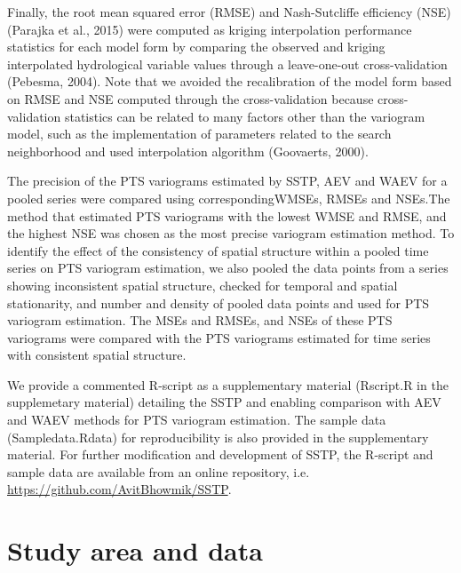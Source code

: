 Finally, the root mean squared error (RMSE) and Nash-Sutcliffe efficiency (NSE) (Parajka et al., 2015) were computed as kriging interpolation performance statistics for each model form by comparing the observed and kriging interpolated hydrological variable values through a leave-one-out cross-validation (Pebesma, 2004). Note that we avoided the recalibration of the model form based on RMSE and NSE computed through the cross-validation because cross-validation statistics can be related to many factors other than the variogram model, such as the implementation of parameters related to the search neighborhood and used interpolation algorithm (Goovaerts, 2000).

The precision of the PTS variograms estimated by SSTP, AEV and WAEV for a pooled series were compared using correspondingWMSEs, RMSEs and NSEs.The method that estimated PTS variograms with the lowest WMSE and RMSE, and the highest NSE was chosen as the most precise variogram estimation method. To identify the effect of the consistency of spatial structure within a pooled time series on PTS variogram estimation, we also pooled the data points from a series showing inconsistent spatial structure, checked for temporal and spatial stationarity, and number and density of pooled data points and used for PTS variogram estimation. The MSEs and RMSEs, and NSEs of these PTS variograms were compared with the PTS variograms estimated for time series with consistent spatial structure.

We provide a commented R-script as a supplementary material (R\textunderscore script.R in the supplemetary material) detailing the SSTP and enabling comparison with AEV and WAEV methods for PTS variogram estimation. The sample data (Sample\textunderscore data.Rdata) for reproducibility is also provided in the supplementary material. For further modification and development of SSTP, the R-script and sample data are available from an online repository, i.e. \href{https://github.com/AvitBhowmik/SSTP}{https://github.com/AvitBhowmik/SSTP}.


\section{Study area and data}
\label{Study area and data}

